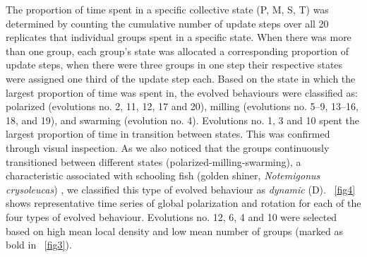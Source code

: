 The proportion of time spent in a specific collective state (P, M, S, T) was determined by counting the cumulative number of update steps over all 20 replicates that individual groups spent in a specific state. When there was more than one group, each group's state was allocated a corresponding proportion of update steps, \eg when there were three groups in one step their respective states were assigned one third of the update step each. Based on the state in which the largest proportion of time was spent in, the evolved behaviours were classified as: polarized (evolutions no. 2, 11, 12, 17 and 20), milling (evolutions no. 5--9, 13--16, 18, and 19), and swarming (evolution no. 4). Evolutions no. 1, 3 and 10 spent the largest proportion of time in transition between states. This was confirmed through visual inspection. As we also noticed that the groups continuously transitioned between different states (polarized-milling-swarming), a characteristic associated with schooling fish (golden shiner, \emph{Notemigonus crysoleucas}) \cite{tunstrom2013collective}, we classified this type of evolved behaviour as \emph{dynamic} (D). \figurename~\ref{fig4} shows representative time series of global polarization and rotation for each of the four types of evolved behaviour. Evolutions no. 12, 6, 4 and 10 were selected based on high mean local density and low mean number of groups (marked as bold in \figurename~\ref{fig3}).

